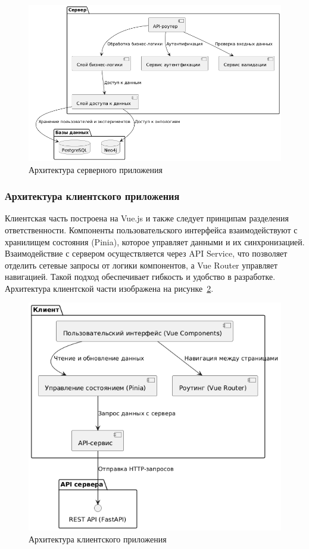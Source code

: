 \begin{figure}[H]
	\centering
	\includegraphics[width=0.7\linewidth]{chapters/img/server_arch.png}
	\caption{Архитектура серверного приложения}
	\label{pic:server_arch}
\end{figure}

\subsubsection{Архитектура клиентского приложения}

Клиентская часть построена на Vue.js и также следует принципам разделения ответственности. Компоненты пользовательского интерфейса взаимодействуют с хранилищем состояния (Pinia\cite{Library:Pinia}), которое управляет данными и их синхронизацией. Взаимодействие с сервером осуществляется через API Service, что позволяет отделить сетевые запросы от логики компонентов, а Vue Router\cite{Library:VueRouter} управляет навигацией. Такой подход обеспечивает гибкость и удобство в разработке. Архитектура клиентской части изображена на рисунке~\ref{pic:client_arch}.

\begin{figure}[H]
	\centering
	\includegraphics[width=\linewidth]{chapters/img/client_arch.png}
	\caption{Архитектура клиентского приложения}
	\label{pic:client_arch}
\end{figure}

